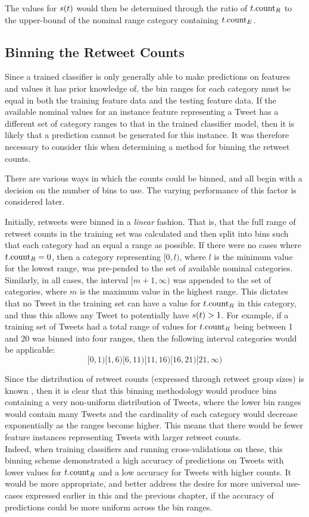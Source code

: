 The values for $s(t)$ would then be determined through the ratio of $t.\textrm{count}_R$ to the upper-bound of the nominal range category containing $t.\textrm{count}_E$.


\subsection{Binning the Retweet Counts}
Since a trained classifier is only generally able to make predictions on features and values it has prior knowledge of, the bin ranges for each category must be equal in both the training feature data and the testing feature data. If the available nominal values for an instance feature representing a Tweet has a different set of category ranges to that in the trained classifier model, then it is likely that a prediction cannot be generated for this instance. It was therefore necessary to consider this when determining a method for binning the retweet counts.

There are various ways in which the counts could be binned, and all begin with a decision on the number of bins to use. The varying performance of this factor is considered later.

Initially, retweets were binned in a \textit{linear} fashion. That is, that the full range of retweet counts in the training set was calculated and then split into bins such that each category had an equal a range as possible. If there were no cases where $t.\textrm{count}_R = 0$, then a category representing $[0,l)$, where $l$ is the minimum value for the lowest range, was pre-pended to the set of available nominal categories. Similarly, in all cases, the interval $[m+1,\infty)$ was appended to the set of categories, where $m$ is the maximum value in the highest range. This dictates that no Tweet in the training set can have a value for $t.\textrm{count}_R$ in this category, and thus this allows any Tweet to potentially have $s(t) > 1$. For example, if a training set of Tweets had a total range of values for $t.\textrm{count}_R$ being between 1 and 20 was binned into four ranges, then the following interval categories would be applicable:
\[
    [0,1) [1,6) [6,11) [11,16) [16,21) [21,\infty)
\]

Since the distribution of retweet counts (expressed through retweet group sizes) is known \cite{webberley11}, then it is clear that this binning methodology would produce bins containing a very non-uniform distribution of Tweets, where the lower bin ranges would contain many Tweets and the cardinality of each category would decrease exponentially as the ranges become higher. This means that there would be fewer feature instances representing Tweets with larger retweet counts.\\
 Indeed, when training classifiers and running cross-validations on these, this binning scheme demonstrated a high accuracy of predictions on Tweets with lower values for $t.\textrm{count}_R$ and a low accuracy for Tweets with higher counts. It would be more appropriate, and better address the desire for more universal use-cases expressed earlier in this and the previous chapter, if the accuracy of predictions could be more uniform across the bin ranges.

